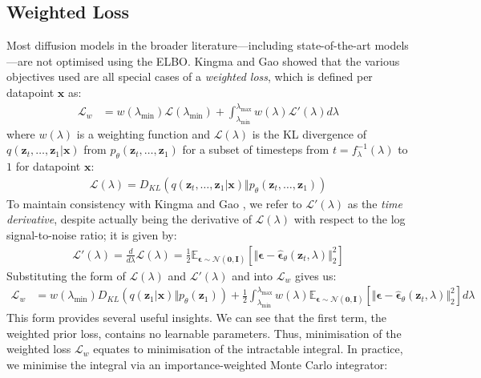 \documentclass[ oneside,%
                    author={George Herbert},
                    degree={MSci},
                     title={Video Diffusion Models for Climate Simulations},
                  subtitle={}]{dissertation}
\begin{document}
\subsection{Weighted Loss}
\label{sec:background_diffusion_weighted_loss}

Most diffusion models in the broader literature---including state-of-the-art models---are not optimised using the ELBO. Kingma and Gao \cite{Understanding_Diffusion_Objective_Kingma} showed that the various objectives used are all special cases of a \textit{weighted loss}, which is defined per datapoint $\mathbf{x}$ as:
\begin{align}
      \mathcal{L}_w&=w(\lambda_{\min})\mathcal{L}(\lambda_{\min})+\int_{\lambda_{\min}}^{\lambda_{\max}}w(\lambda)\mathcal{L}'(\lambda)d\lambda
\end{align}
where $w(\lambda)$ is a weighting function and $\mathcal{L}(\lambda)$ is the KL divergence of $q(\mathbf{z}_t,\ldots,\mathbf{z}_1|\mathbf{x})$ from $p_\theta(\mathbf{z}_t,\ldots,\mathbf{z}_1)$ for a subset of timesteps from $t=f_\lambda^{-1}(\lambda)$ to $1$ for datapoint $\mathbf{x}$:
\begin{align}
      \mathcal{L}(\lambda)=D_{KL}(q(\mathbf{z}_t,\ldots,\mathbf{z}_1|\mathbf{x})\Vert p_\theta(\mathbf{z}_t,\ldots,\mathbf{z}_1))
\end{align}
To maintain consistency with Kingma and Gao \cite{Understanding_Diffusion_Objective_Kingma}, we refer to $\mathcal{L}'(\lambda)$ as the \textit{time derivative}, despite actually being the derivative of $\mathcal{L}(\lambda)$ with respect to the log signal-to-noise ratio; it is given by:
\begin{align}
      \mathcal{L}'(\lambda)=\frac{d}{d\lambda}\mathcal{L}(\lambda)=\frac{1}{2}\mathbb{E}_{\boldsymbol\epsilon\sim\mathcal{N}(\mathbf{0},\mathbf{I})}\left[\Vert\boldsymbol\epsilon-\hat{\boldsymbol\epsilon}_\theta(\mathbf{z}_t,\lambda)\Vert_2^2\right]
\end{align}
Substituting the form of $\mathcal{L}(\lambda)$ and $\mathcal{L}'(\lambda)$ and into $\mathcal{L}_w$ gives us:
\begin{align}
      \mathcal{L}_w&=w(\lambda_{\min})D_{KL}(q(\mathbf{z}_1|\mathbf{x})\Vert p_\theta(\mathbf{z}_1))+\frac{1}{2}\int_{\lambda_{\min}}^{\lambda_{\max}}w(\lambda)\mathbb{E}_{\boldsymbol\epsilon\sim\mathcal{N}(\mathbf{0},\mathbf{I})}\left[\Vert\boldsymbol\epsilon-\hat{\boldsymbol\epsilon}_\theta(\mathbf{z}_t,\lambda)\Vert_2^2\right]d\lambda
\end{align}
This form provides several useful insights. We can see that the first term, the weighted prior loss, contains no learnable parameters. Thus, minimisation of the weighted loss $\mathcal{L}_w$ equates to minimisation of the intractable integral. In practice, we minimise the integral via an importance-weighted Monte Carlo integrator:
\end{document}
